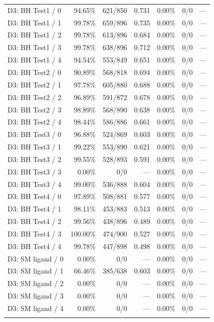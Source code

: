 \begin{longtable}{@{}lrrrrrr@{}}
\addlinespace
D3: BH Test1 / 0 & 94.65\% & 621/850 & 0.731 & 0.00\% & 0/0 & --- \\
D3: BH Test1 / 1 & 99.78\% & 659/896 & 0.735 & 0.00\% & 0/0 & --- \\
D3: BH Test1 / 2 & 99.78\% & 613/896 & 0.684 & 0.00\% & 0/0 & --- \\
D3: BH Test1 / 3 & 99.78\% & 638/896 & 0.712 & 0.00\% & 0/0 & --- \\
D3: BH Test1 / 4 & 94.54\% & 553/849 & 0.651 & 0.00\% & 0/0 & --- \\
\addlinespace
D3: BH Test2 / 0 & 90.89\% & 568/818 & 0.694 & 0.00\% & 0/0 & --- \\
D3: BH Test2 / 1 & 97.78\% & 605/880 & 0.688 & 0.00\% & 0/0 & --- \\
D3: BH Test2 / 2 & 96.89\% & 591/872 & 0.678 & 0.00\% & 0/0 & --- \\
D3: BH Test2 / 3 & 98.89\% & 568/890 & 0.638 & 0.00\% & 0/0 & --- \\
D3: BH Test2 / 4 & 98.44\% & 586/886 & 0.661 & 0.00\% & 0/0 & --- \\
\addlinespace
D3: BH Test3 / 0 & 96.88\% & 524/869 & 0.603 & 0.00\% & 0/0 & --- \\
D3: BH Test3 / 1 & 99.22\% & 553/890 & 0.621 & 0.00\% & 0/0 & --- \\
D3: BH Test3 / 2 & 99.55\% & 528/893 & 0.591 & 0.00\% & 0/0 & --- \\
D3: BH Test3 / 3 & 0.00\% & 0/0 & --- & 0.00\% & 0/0 & --- \\
D3: BH Test3 / 4 & 99.00\% & 536/888 & 0.604 & 0.00\% & 0/0 & --- \\
\addlinespace
D3: BH Test4 / 0 & 97.89\% & 508/881 & 0.577 & 0.00\% & 0/0 & --- \\
D3: BH Test4 / 1 & 98.11\% & 453/883 & 0.513 & 0.00\% & 0/0 & --- \\
D3: BH Test4 / 2 & 99.56\% & 438/896 & 0.489 & 0.00\% & 0/0 & --- \\
D3: BH Test4 / 3 & 100.00\% & 474/900 & 0.527 & 0.00\% & 0/0 & --- \\
D3: BH Test4 / 4 & 99.78\% & 447/898 & 0.498 & 0.00\% & 0/0 & --- \\
\addlinespace
D3: SM ligand / 0 & 0.00\% & 0/0 & --- & 0.00\% & 0/0 & --- \\
D3: SM ligand / 1 & 66.46\% & 385/638 & 0.603 & 0.00\% & 0/0 & --- \\
D3: SM ligand / 2 & 0.00\% & 0/0 & --- & 0.00\% & 0/0 & --- \\
D3: SM ligand / 3 & 0.00\% & 0/0 & --- & 0.00\% & 0/0 & --- \\
D3: SM ligand / 4 & 0.00\% & 0/0 & --- & 0.00\% & 0/0 & --- \\
\addlinespace
\end{longtable}